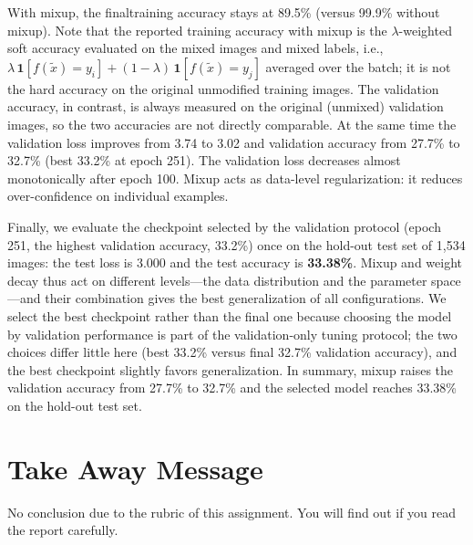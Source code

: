 \documentclass[letterpaper]{article} %
\begin{document}
With mixup, the finaltraining accuracy stays 
at 89.5\% (versus 99.9\% without mixup).  Note that the reported training
accuracy with mixup is the $\lambda$-weighted soft accuracy evaluated on the
mixed images and mixed labels, i.e.,
$\lambda\,\mathbf{1}[f(\tilde{x})=y_i]
+(1-\lambda)\,\mathbf{1}[f(\tilde{x})=y_j]$ averaged over the batch; it is
not the hard accuracy on the original unmodified training images.  The
validation accuracy, in contrast, is always measured on the original
(unmixed) validation images, so the two accuracies are not directly
comparable.  At the same time the validation loss improves from 3.74 to 3.02
and validation accuracy from 27.7\% to 32.7\% (best 33.2\% at epoch 251).
The validation loss decreases almost monotonically after epoch 100.  
Mixup acts as data-level regularization: it reduces over-confidence 
on individual examples.

Finally, we evaluate the checkpoint selected by the validation protocol
(epoch 251, the highest validation accuracy, 33.2\%) once on the hold-out
test set of 1{,}534 images: the test loss is 3.000 and the test accuracy is
\textbf{33.38\%}. Mixup and weight decay thus act on different
levels---the data distribution and the parameter space---and their
combination gives the best generalization of all configurations. We select
the best checkpoint rather than the final one because choosing the model by
validation performance is part of the validation-only tuning protocol; the
two choices differ little here (best 33.2\% versus final 32.7\% validation
accuracy), and the best checkpoint slightly favors generalization.  In
summary, mixup raises the validation accuracy from 27.7\% to 32.7\% and the 
selected model reaches 33.38\% on the hold-out test set.

\section{Take Away Message}

No conclusion due to the rubric of this assignment\cite{li2026ai6103}. 
You will find out if you read the report carefully.
\end{document}
